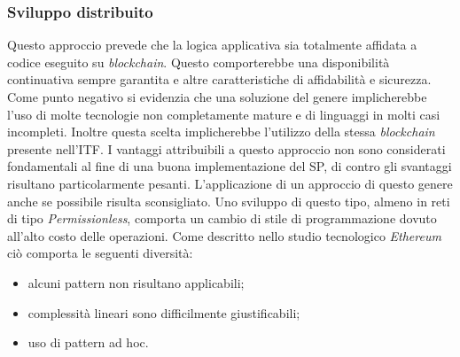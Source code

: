 \subsubsection{Sviluppo distribuito}  
Questo approccio prevede che la logica applicativa sia totalmente affidata a codice eseguito su \emph{blockchain}. Questo comporterebbe una disponibilità continuativa sempre garantita e altre caratteristiche di affidabilità e sicurezza. Come punto negativo si evidenzia che una soluzione del genere implicherebbe l’uso di molte tecnologie non completamente mature e di linguaggi in molti casi incompleti. Inoltre questa scelta implicherebbe l’utilizzo della stessa \emph{blockchain} presente nell’ITF. I vantaggi attribuibili a questo approccio non sono considerati fondamentali al fine di una buona implementazione del SP, di contro gli svantaggi risultano particolarmente pesanti. L’applicazione di un approccio di questo genere anche se possibile risulta sconsigliato. Uno sviluppo di questo tipo, almeno in reti di tipo \emph{Permissionless}, comporta un cambio di stile di programmazione dovuto all’alto costo delle operazioni. Come descritto nello studio tecnologico \emph{Ethereum} ciò comporta le seguenti diversità:
\begin{itemize}
    \item alcuni pattern non risultano applicabili;
    \item complessità lineari sono difficilmente giustificabili;
    \item uso di pattern ad hoc.
\end{itemize}
